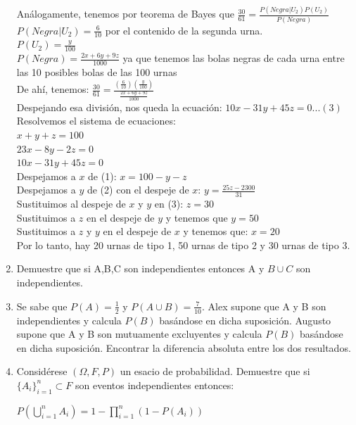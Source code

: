 \documentclass[12pt,a4paper]{report}
\begin{document}
\begin{enumerate}
{Análogamente, tenemos por teorema de Bayes que $\frac{30}{61} = \frac{P(Negra| U_{2})P(U_{2})}{P(Negra)}$\\
$P(Negra| U_{2}) = \frac{6}{10}$ por el contenido de la segunda urna.\\
$P(U_{2}) = \frac{y}{100}$\\
$P(Negra) = \frac{2x + 6y +9z}{1000}$ ya que tenemos las bolas negras de cada urna entre las 10 posibles bolas de las 100 urnas\\
De ahí, tenemos: $\frac{30}{61} = \frac{(\frac{6}{10})(\frac{y}{100})}{\frac{2x +6y +9z}{1000}}$\\
Despejando esa división, nos queda la ecuación: $10x -31y +45z = 0 ...(3)$\\

Resolvemos el sistema de ecuaciones:\\
$x + y + z = 100$\\
$23x -8y-2z = 0$\\
$10x -31y +45z = 0$\\

Despejamos a $x$ de (1): $ x = 100 -y -z$\\
Despejamos a $y$ de (2) con el despeje de $x$: $ y = \frac{25z -2300}{31}$\\
Sustituimos al despeje de $x$ y $y$ en (3): $z = 30$\\
Sustituimos a $z$ en el despeje de $y$ y tenemos que $y = 50$\\
Sustituimos a $z$ y $y$ en el despeje de $x$ y tenemos que: $x = 20$\\

Por lo tanto, hay 20 urnas de tipo 1, 50 urnas de tipo 2 y 30 urnas de tipo 3.\\
	
	}

   \item {
   Demuestre que si A,B,C son independientes entonces A y $B\cup C$ son independientes.
	
    }

   \item {
   Se sabe que $P(A)= \frac{1}{2}$ y $P(A\cup B)=\frac{7}{10}$. Alex supone que A y B son independientes y calcula $P(B)$ basándose en dicha suposición. Augusto supone que A y B son mutuamente excluyentes y calcula $P(B)$ basándose en dicha suposición. Encontrar la diferencia absoluta entre los dos resultados.
	}

   \item {
   Considérese $(\Omega,F, P)$ un esacio de probabilidad. Demuestre que si $\lbrace A_{i} \rbrace _{i=1}^{n} \subset F$ son eventos independientes entonces:\\
   \begin{center}
   $P(\bigcup\limits_{i=1}^{n} A_{i})=1-\prod\limits_{i=1}^{n} (1-P(A_{i}))$
   \end{center}
	}


\end{enumerate}
\end{document}
